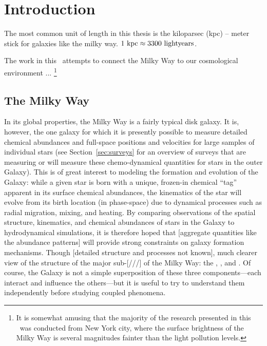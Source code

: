 \chapter[Introduction]{Introduction}
\label{ch:intro}


The most common unit of length in this thesis is the kiloparsec (kpc) -- meter stick for galaxies like the milky way. $1~{\rm kpc} \approx 3300~{\rm light years}$.

The work in this \article\ attempts to connect the Milky Way to our cosmological environment ... \footnote{It is somewhat amusing that the majority of the research presented in this \article\ was conducted from New York city, where the surface brightness of the Milky Way is several magnitudes fainter than the light pollution levels.}

\section{The Milky Way}\label{sec:milkyway}

In its global properties, the Milky Way is a fairly typical disk galaxy. It is, however, the one galaxy for which it is presently possible to measure detailed chemical abundances and full-space positions and velocities for large samples of individual stars (see Section~\ref{sec:surveys} for an overview of surveys that are measuring or will measure these chemo-dynamical quantities for stars in the outer Galaxy). This is of great interest to modeling the formation and evolution of the Galaxy: while a given star is born with a unique, frozen-in chemical ``tag'' apparent in its surface chemical abundances, the kinematics of the star will evolve from its birth location (in phase-space) due to dynamical processes such as radial migration, mixing, and heating. By comparing observations of the spatial structure, kinematics, and chemical abundances of stars in the Galaxy to hydrodynamical simulations, it is therefore hoped that [aggregate quantities like the abundance patterns] will provide strong constraints on galaxy formation mechanisms. Though [detailed structure and processes not known], much clearer view of the structure of the major sub-[///] of the Milky Way: the \mwdisk, \mwbulge, and \mwhalo. Of course, the Galaxy is not a simple superposition of these three components---each interact and influence the others---but it is useful to try to understand them independently before studying coupled phenomena. 

